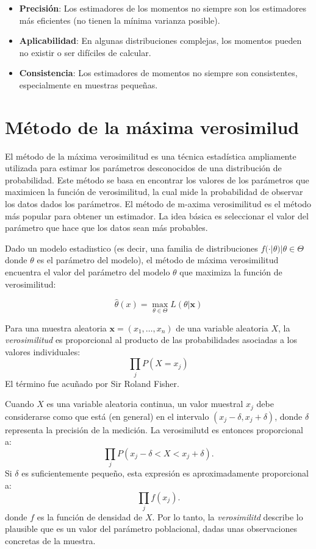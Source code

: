 \documentclass[
  letterpaper,
  DIV=11,
  numbers=noendperiod]{scrreprt}
\providecommand{\tightlist}{%
  \setlength{\itemsep}{0pt}\setlength{\parskip}{0pt}}\usepackage{longtable,booktabs,array}
\begin{document}
\begin{itemize}
\tightlist
\item
  \textbf{Precisión}: Los estimadores de los momentos no siempre son los
  estimadores más eficientes (no tienen la mínima varianza posible).
\item
  \textbf{Aplicabilidad}: En algunas distribuciones complejas, los
  momentos pueden no existir o ser difíciles de calcular.
\item
  \textbf{Consistencia}: Los estimadores de momentos no siempre son
  consistentes, especialmente en muestras pequeñas.
\end{itemize}

\hypertarget{muxe9todo-de-la-muxe1xima-verosimilud}{%
\section{Método de la máxima
verosimilud}\label{muxe9todo-de-la-muxe1xima-verosimilud}}

El método de la máxima verosimilitud es una técnica estadística
ampliamente utilizada para estimar los parámetros desconocidos de una
distribución de probabilidad. Este método se basa en encontrar los
valores de los parámetros que maximicen la función de verosimilitud, la
cual mide la probabilidad de observar los datos dados los parámetros. El
método de m-axima verosimilitud es el método más popular para obtener un
estimador. La idea básica es seleccionar el valor del parámetro que hace
que los datos sean más probables.

Dado un modelo estadiıstico (es decir, una familia de distribuciones
\(f(·|\theta)| \theta \in \Theta\) donde \(\theta\) es el parámetro del
modelo), el método de máxima verosimilitud encuentra el valor del
parámetro del modelo \(\theta\) que maximiza la función de
verosimilitud:

\[
\hat{\theta}(x)= \max_{\theta \in \Theta}L(\theta|\mathbf{x})
\]

Para una muestra aleatoria \(\mathbf{x}=(x_1,\ldots,x_n)\) de una
variable aleatoria \(X\), la \emph{verosimilitud} es proporcional al
producto de las probabilidades asociadas a los valores individuales: \[
\prod_jP(X=x_j)
\] El término fue acuñado por Sir Roland Fisher.

Cuando \(X\) es una variable aleatoria continua, un valor muestral
\(x_j\) debe considerarse como que está (en general) en el intervalo
\((x_j-\delta,x_j+\delta)\), donde \(\delta\) representa la precisión de
la medición. La verosimilutd es entonces proporcional a: \[
\prod_jP(x_j-\delta<X<x_j+\delta).
\] Si \(\delta\) es suficientemente pequeño, esta expresión es
aproximadamente proporcional a: \[
\prod_jf(x_j).
\] donde \(f\) es la función de densidad de \(X\). Por lo tanto, la
\emph{verosimilitd} describe lo plausible que es un valor del parámetro
poblacional, dadas unas observaciones concretas de la muestra.
\end{document}
